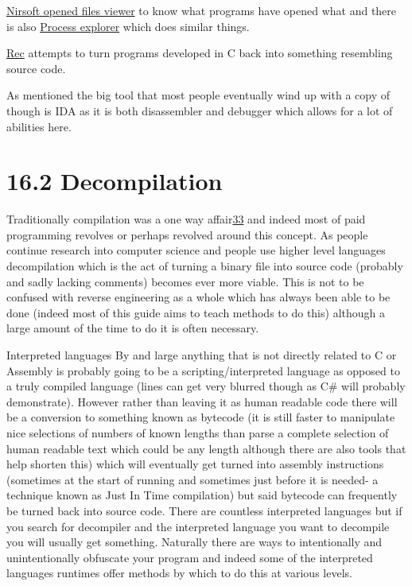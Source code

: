 \documentclass[
]{book}
\begin{document}
\href{http://www.nirsoft.net/utils/opened_files_view.html}{Nirsoft opened files viewer} to know what programs have opened what and there is also \href{http://technet.microsoft.com/en-us/sysinternals/bb896653}{Process explorer} which does similar things.

\href{http://www.backerstreet.com/rec/rec.htm}{Rec} attempts to turn programs developed in C back into something resembling source code.

As mentioned the big tool that most people eventually wind up with a copy of though is IDA as it is both disassembler and debugger which allows for a lot of abilities here.

\hypertarget{decompilation}{%
\section{16.2 Decompilation}\label{decompilation}}

Traditionally compilation was a one way affair\href{romhacking202034.html\#fn33x0}{33} and indeed most of paid programming revolves or perhaps revolved around this concept. As people continue research into computer science and people use higher level languages decompilation which is the act of turning a binary file into source code (probably and sadly lacking comments) becomes ever more viable. This is not to be confused with reverse engineering as a whole which has always been able to be done (indeed most of this guide aims to teach methods to do this) although a large amount of the time to do it is often necessary.

Interpreted languages By and large anything that is not directly related to C or Assembly is probably going to be a scripting/interpreted language as opposed to a truly compiled language (lines can get very blurred though as C\# will probably demonstrate). However rather than leaving it as human readable code there will be a conversion to something known as bytecode (it is still faster to manipulate nice selections of numbers of known lengths than parse a complete selection of human readable text which could be any length although there are also tools that help shorten this) which will eventually get turned into assembly instructions (sometimes at the start of running and sometimes just before it is needed- a technique known as Just In Time compilation) but said bytecode can frequently be turned back into source code. There are countless interpreted languages but if you search for decompiler and the interpreted language you want to decompile you will usually get something. Naturally there are ways to intentionally and unintentionally obfuscate your program and indeed some of the interpreted languages runtimes offer methods by which to do this at various levels.
\end{document}
